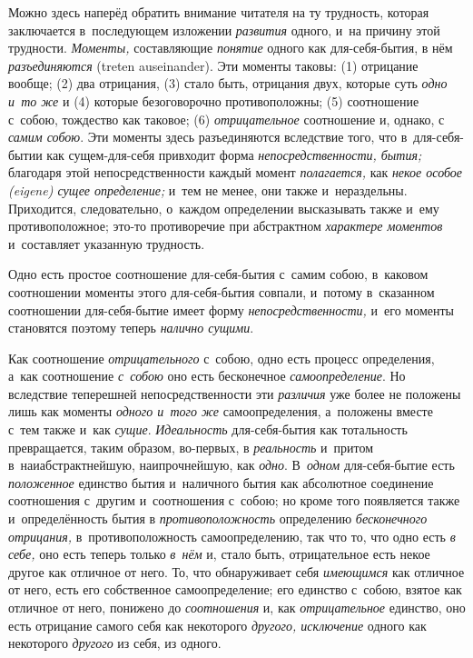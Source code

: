 Можно здесь наперёд обратить внимание читателя на ту трудность, которая
заключается в~последующем изложении {\em развития}
одного, и~на причину этой трудности. {\em Моменты,}
составляющие {\em понятие} одного как для-себя-бытия, в
нём {\em разъединяются} (treten auseinander). Эти
моменты таковы: (1) отрицание вообще; (2) два отрицания, (3) стало быть,
отрицания двух, которые суть {\em одно и~то же} и (4)
которые безоговорочно противоположны; (5) соотношение с~собою, тождество
как таковое; (6) {\em отрицательное} соотношение и,
однако, с {\em самим собою}. Эти моменты здесь
разъединяются вследствие того, что в~для-себя-бытии как сущем-для-себя
привходит форма {\em непосредственности, бытия;}
благодаря этой непосредственности каждый
момент {\em полагается,} как
{\em некое особое (eigene) сущее определение;} и~тем не
менее, они также и~нераздельны. Приходится, следовательно, о~каждом
определении высказывать также и~ему противоположное; это-то противоречие
при абстрактном {\em характере моментов} и~составляет указанную трудность.


Одно есть простое соотношение для-себя-бытия с~самим собою, в~каковом
соотношении моменты этого для-себя-бытия совпали, и~потому в~сказанном
соотношении для-себя-бытие имеет форму
{\em непосредственности,} и~его моменты становятся
поэтому теперь {\em налично сущими}.

Как соотношение {\em отрицательного} с~собою, одно есть
процесс определения, а~как соотношение {\em с~собою}
оно есть бесконечное {\em самоопределение}. Но
вследствие теперешней непосредственности эти
{\em различия} уже более не положены лишь как моменты
{\em одного и~того же} самоопределения, а~положены
вместе с~тем также и~как {\em сущие}.
{\em Идеальность} для-себя-бытия как тотальность
превращается, таким образом, во-первых, в
{\em реальность} и~притом в~наиабстрактнейшую,
наипрочнейшую, как {\em одно}. В~{\em одном} для-себя-бытие есть
{\em положенное} единство бытия и~наличного бытия как
абсолютное соединение соотношения с~другим и~соотношения с~собою; но кроме
того появляется также и~определённость бытия в
{\em противоположность} определению
{\em бесконечного отрицания,} в~противоположность
самоопределению, так что то, что одно есть {\em в
себе,} оно есть теперь только {\em в~нём} и, стало
быть, отрицательное есть некое другое как отличное от него. То, что
обнаруживает себя {\em имеющимся} как отличное от него,
есть его собственное самоопределение; его единство с~собою, взятое как
отличное от него, понижено до {\em соотношения} и, как
{\em отрицательное} единство, оно есть отрицание самого
себя как некоторого {\em другого, исключение} одного как некоторого
{\em другого} из себя, из одного.

